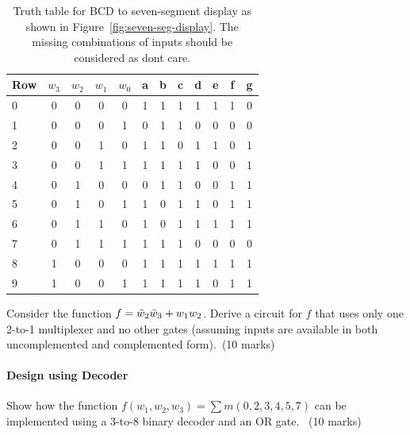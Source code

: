 \begin{table}[h!]
  \footnotesize
\begin{tabular}{l|cccc||ccccccc}
  \toprule
  Row & $w_3$ & $w_2$ & $w_1$ & $w_0$ & a & b & c & d & e & f & g \\
  \midrule
  0  & 0    & 0   &   0 &   0 & 1 & 1 & 1 & 1 & 1 & 1 & 0 \\
  1  & 0    & 0   &   0 &   1 & 0 & 1 & 1 & 0 & 0 & 0 & 0 \\
  2  & 0    & 0   &   1 &   0 & 1 & 1 & 0 & 1 & 1 & 0 & 1 \\ 
  3  & 0    & 0   &   1 &   1 & 1 & 1 & 1 & 1 & 0 & 0 & 1 \\ 
  4  & 0    & 1   &   0 &   0 & 0 & 1 & 1 & 0 & 0 & 1 & 1 \\ 
  5  & 0    & 1   &   0 &   1 & 1 & 0 & 1 & 1 & 0 & 1 & 1 \\   
  6  & 0    & 1   &   1 &   0 & 1 & 0 & 1 & 1 & 1 & 1 & 1 \\ 
  7  & 0    & 1   &   1 &   1 & 1 & 1 & 1 & 0 & 0 & 0 & 0 \\ 
  8  & 1    & 0   &   0 &   0 & 1 & 1 & 1 & 1 & 1 & 1 & 1 \\
  9  & 1    & 0   &   0 &   1 & 1 & 1 & 1 & 1 & 0 & 1 & 1 \\
  \bottomrule
\end{tabular}
\caption{Truth table for BCD to seven-segment display as shown in
  Figure~\ref{fig:seven-seg-display}. The missing combinations of inputs should
  be considered as dont care.}
\label{tab:seven-segment-tt}
\end{table}

\begin{prob}
  Consider the function $f = \bar{w}_2 \bar{w}_3 + w_1 w_2$.  Derive a circuit for
  $f$ that uses only one 2-to-1 multiplexer and no other gates (assuming inputs
  are available in both uncomplemented and complemented form).~\cite[Prob 4.4]{brown2013fundamentals}(10 marks)
\end{prob}

\paragraph*{Design using Decoder}
\begin{prob}
  Show how the function $f (w_1 , w_2 , w_3 ) = \sum m(0, 2, 3, 4, 5, 7)$ can be implemented using a
  3-to-8 binary decoder and an OR gate.~\cite[Prob 4.1]{brown2013fundamentals}
  (10 marks)
\end{prob}


%
%
%
